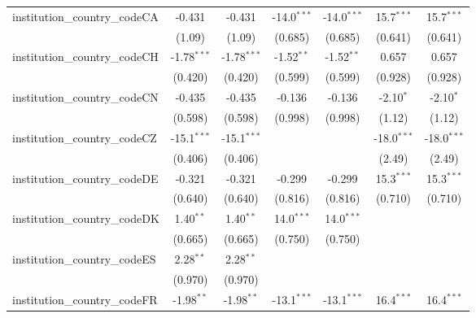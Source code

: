 \begin{tabular}{lcccccc}
   institution\_country\_codeCA          & -0.431        & -0.431        & -14.0$^{***}$ & -14.0$^{***}$ & 15.7$^{***}$  & 15.7$^{***}$\\   
                                         & (1.09)        & (1.09)        & (0.685)       & (0.685)       & (0.641)       & (0.641)\\   
   institution\_country\_codeCH          & -1.78$^{***}$ & -1.78$^{***}$ & -1.52$^{**}$  & -1.52$^{**}$  & 0.657         & 0.657\\   
                                         & (0.420)       & (0.420)       & (0.599)       & (0.599)       & (0.928)       & (0.928)\\   
   institution\_country\_codeCN          & -0.435        & -0.435        & -0.136        & -0.136        & -2.10$^{*}$   & -2.10$^{*}$\\   
                                         & (0.598)       & (0.598)       & (0.998)       & (0.998)       & (1.12)        & (1.12)\\   
   institution\_country\_codeCZ          & -15.1$^{***}$ & -15.1$^{***}$ &               &               & -18.0$^{***}$ & -18.0$^{***}$\\   
                                         & (0.406)       & (0.406)       &               &               & (2.49)        & (2.49)\\   
   institution\_country\_codeDE          & -0.321        & -0.321        & -0.299        & -0.299        & 15.3$^{***}$  & 15.3$^{***}$\\   
                                         & (0.640)       & (0.640)       & (0.816)       & (0.816)       & (0.710)       & (0.710)\\   
   institution\_country\_codeDK          & 1.40$^{**}$   & 1.40$^{**}$   & 14.0$^{***}$  & 14.0$^{***}$  &               &   \\   
                                         & (0.665)       & (0.665)       & (0.750)       & (0.750)       &               &   \\   
   institution\_country\_codeES          & 2.28$^{**}$   & 2.28$^{**}$   &               &               &               &   \\   
                                         & (0.970)       & (0.970)       &               &               &               &   \\   
   institution\_country\_codeFR          & -1.98$^{**}$  & -1.98$^{**}$  & -13.1$^{***}$ & -13.1$^{***}$ & 16.4$^{***}$  & 16.4$^{***}$\\   

\end{tabular}
